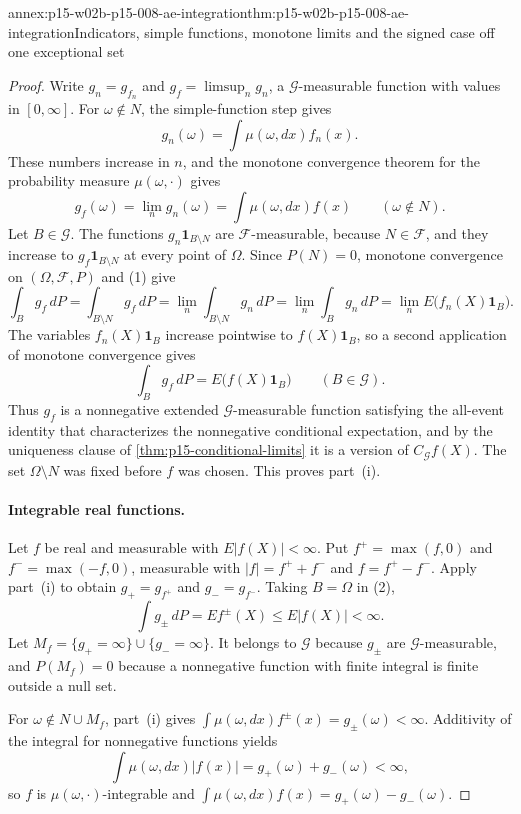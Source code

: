 \begin{annexitem}{annex:p15-w02b-p15-008-ae-integration}{thm:p15-w02b-p15-008-ae-integration}{Indicators, simple functions, monotone limits and the signed case off one exceptional set}
\begin{proof}
Write \(g_n=g_{f_n}\) and \(g_f=\limsup_ng_n\), a
\(\mathcal G\)-measurable function with values in \([0,\infty]\).
For \(\omega\notin N\), the simple-function step gives
\[
                  g_n(\omega)=\int\mu(\omega,dx)f_n(x).
\]
These numbers increase in \(n\),
and the monotone convergence theorem for the probability measure
\(\mu(\omega,\cdot)\) gives
\[
       g_f(\omega)=\lim_ng_n(\omega)=\int\mu(\omega,dx)f(x)
                                       \qquad(\omega\notin N).
\]
Let \(B\in\mathcal G\). The functions \(g_n\mathbf1_{B\setminus N}\) are
\(\mathcal F\)-measurable, because \(N\in\mathcal F\), and they increase
to \(g_f\mathbf1_{B\setminus N}\) at every point of \(\Omega\).
Since \(P(N)=0\), monotone convergence on \((\Omega,\mathcal F,P)\) and (1)
give
\[
 \int_Bg_f\,dP=\int_{B\setminus N}g_f\,dP
   =\lim_n\int_{B\setminus N}g_n\,dP
   =\lim_n\int_Bg_n\,dP
   =\lim_nE\bigl(f_n(X)\mathbf1_B\bigr).
\]
The variables \(f_n(X)\mathbf1_B\) increase pointwise to
\(f(X)\mathbf1_B\), so a second application of monotone convergence gives
\[
          \int_Bg_f\,dP=E\bigl(f(X)\mathbf1_B\bigr)
                          \qquad(B\in\mathcal G).
          \tag{2}
\]
Thus \(g_f\) is a nonnegative extended \(\mathcal G\)-measurable function
satisfying the all-event identity that characterizes the nonnegative
conditional expectation, and by the uniqueness clause of
\cref{thm:p15-conditional-limits} it is a version of
\(C_{\mathcal G}f(X)\). The set \(\Omega\setminus N\) was fixed before
\(f\) was chosen. This proves part~(i).

\paragraph{Integrable real functions.}
Let \(f\) be real and measurable with \(E|f(X)|<\infty\). Put
\(f^+=\max(f,0)\) and \(f^-=\max(-f,0)\), measurable with
\(|f|=f^++f^-\) and \(f=f^+-f^-\). Apply part~(i) to obtain
\(g_+=g_{f^+}\) and \(g_-=g_{f^-}\). Taking \(B=\Omega\) in (2),
\[
          \int g_\pm\,dP=E f^\pm(X)\leq E|f(X)|<\infty .
\]
Let \(M_f=\{g_+=\infty\}\cup\{g_-=\infty\}\). It belongs to \(\mathcal G\)
because \(g_\pm\) are \(\mathcal G\)-measurable, and \(P(M_f)=0\) because
a nonnegative function with finite integral is finite outside a null set.

For \(\omega\notin N\cup M_f\), part~(i) gives
\(\int\mu(\omega,dx)f^\pm(x)=g_\pm(\omega)<\infty\). Additivity of the
integral for nonnegative functions yields
\[
 \int\mu(\omega,dx)|f(x)|=g_+(\omega)+g_-(\omega)<\infty,
\]
so \(f\) is \(\mu(\omega,\cdot)\)-integrable and
\(\int\mu(\omega,dx)f(x)=g_+(\omega)-g_-(\omega)\).


\end{proof}
\end{annexitem}
